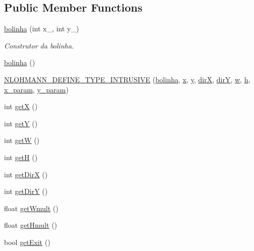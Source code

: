 \subsection*{Public Member Functions}
\begin{DoxyCompactItemize}
\item 
\hyperlink{classbolinha_a157417fa65cf082083216e56ddab736a}{bolinha} (int x\+\_\+, int y\+\_\+)
\begin{DoxyCompactList}\small\item\em Construtor da bolinha. \end{DoxyCompactList}\item 
\hyperlink{classbolinha_afd9c0cf1e0c6fc54ebac1c950fdb182d}{bolinha} ()
\item 
\hyperlink{classbolinha_ad14e4c36911a540dd4e0b23125c2c489}{N\+L\+O\+H\+M\+A\+N\+N\+\_\+\+D\+E\+F\+I\+N\+E\+\_\+\+T\+Y\+P\+E\+\_\+\+I\+N\+T\+R\+U\+S\+I\+VE} (\hyperlink{classbolinha}{bolinha}, \hyperlink{classbolinha_ad6918f0b95a774318e4ceb7c3f9720de}{x}, \hyperlink{classbolinha_a1ef5bc9948639dc0065e17a8e6b88846}{y}, \hyperlink{classbolinha_a0e4ccf4bf9cd1b980323dbcba247ca8b}{dirX}, \hyperlink{classbolinha_a9ed43eedc9ce54d9645824b4a876171e}{dirY}, \hyperlink{classbolinha_a4136d7cb978a3190073e1544fb336876}{w}, \hyperlink{classbolinha_a971dc9047d1dcc5fd7cf4c4ed945de45}{h}, \hyperlink{classbolinha_ac9d2238772d85a88f57602ff7bfd8387}{x\+\_\+param}, \hyperlink{classbolinha_a2fe551614672e64a4f34ecdd226de4ca}{y\+\_\+param})
\item 
int \hyperlink{classbolinha_a16bfb1ab48a09a3dd5cf5868cb2f475d}{getX} ()
\item 
int \hyperlink{classbolinha_a143dbe11a42e1fcdccb1f19d4d9f715e}{getY} ()
\item 
int \hyperlink{classbolinha_ab5cbca5168da5df74705fea330490382}{getW} ()
\item 
int \hyperlink{classbolinha_ae6c9c0d7b5770ca865e1bd5cc1f773f4}{getH} ()
\item 
int \hyperlink{classbolinha_acb37ecbc6681ac8cc433e21a8fe77328}{get\+DirX} ()
\item 
int \hyperlink{classbolinha_af41c7d6e46fcdd428de4e726dbcf5f3a}{get\+DirY} ()
\item 
float \hyperlink{classbolinha_a90342ef3d458c503db81dd80c53ffa05}{get\+Wmult} ()
\item 
float \hyperlink{classbolinha_ac485ff1907f1416a42511d0d333eef59}{get\+Hmult} ()
\item 
bool \hyperlink{classbolinha_a87e092bdaa996f8c08236d3e3aa4c605}{get\+Exit} ()

\end{DoxyCompactItemize}
